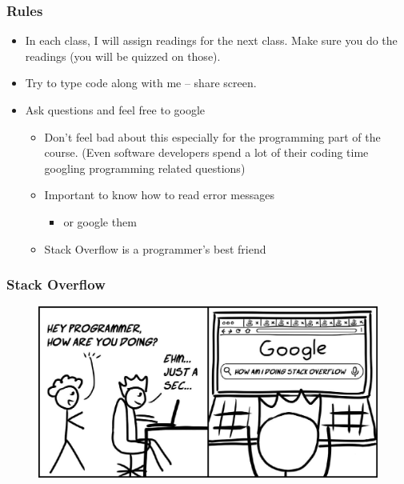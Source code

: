 \documentclass[compress, aspectratio=54]{beamer}
\begin{document}
\begin{frame}
\frametitle{Rules}
\begin{itemize}
\item In each class, I will assign readings for the next class. Make sure you do the readings (you will be quizzed on those).
\item Try to type code along with me -- share screen.
\item Ask questions and feel free to google
\begin{itemize}
\item Don't feel bad about this especially for the programming part of the course. (Even software developers spend a lot of their coding time googling programming related questions)
\item Important to know how to read error messages
\begin{itemize}

\item or google them
\end{itemize}
\item Stack Overflow is a programmer's best friend
\end{itemize}
\end{itemize}
\end{frame}


\begin{frame}
\frametitle{Stack Overflow}

\begin{figure}

\includegraphics[width=0.6\linewidth ]{Figures/stack-overflow.jpeg}
\end{figure}

\end{frame}
\end{document}

